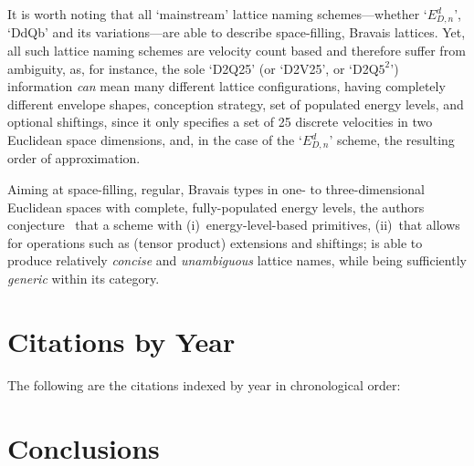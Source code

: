     It is worth noting that all `mainstream' lattice naming schemes---whether `$E_{D,n}^{d}$', `DdQb' and  its  variations---are
    able to describe space-filling, Bravais lattices. Yet, all  such  lattice  naming  schemes  are  velocity  count  based  and
    therefore suffer from ambiguity, as, for instance, the sole `D2Q25' (or `D2V25', or `D2Q$5^2$') information \emph{can}  mean
    many different lattice configurations, having completely different envelope shapes, conception strategy,  set  of  populated
    energy levels, and optional shiftings, since it only specifies a set of  25  discrete  velocities  in  two  Euclidean  space
    dimensions, and, in the case of the `$E_{D,n}^{d}$' scheme, the resulting order of approximation.

    Aiming at space-filling, regular, Bravais types in one- to three-dimensional Euclidean spaces with complete, fully-populated
    energy levels,  the  authors  conjecture~\cite{2020-NaaktgeborenC+AndradeFN-BravLatNam-engrXiv-rev00}  that  a  scheme  with
    (i)~energy-level-based primitives, (ii)~that allows for operations such as (tensor product)  extensions  and  shiftings;  is
    able to produce relatively \emph{concise} and \emph{unambiguous} lattice  names,  while  being  sufficiently  \emph{generic}
    within its category.



\section{Citations by Year}

    The following are the citations indexed by year in chronological order: 



\section{Conclusions}

